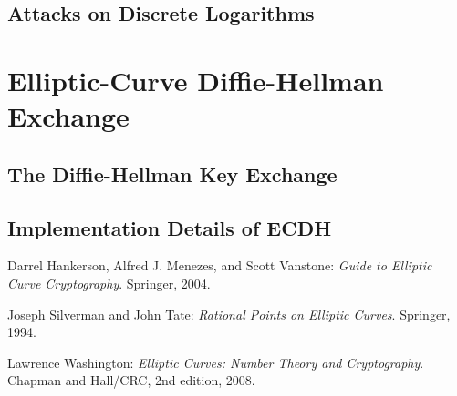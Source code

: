 \documentclass{article}
\begin{document}
\subsection{Attacks on Discrete Logarithms}

\clearpage

\section{Elliptic-Curve Diffie-Hellman Exchange}

\subsection{The Diffie-Hellman Key Exchange}

\subsection{Implementation Details of ECDH}

\clearpage

\begin{thebibliography}{9}

	Darrel Hankerson, Alfred J. Menezes, and Scott Vanstone:
	\emph{Guide to Elliptic Curve Cryptography}.
	Springer,
	2004.

	Joseph Silverman and John Tate:
	\emph{Rational Points on Elliptic Curves}.
	Springer,
	1994.

	Lawrence Washington:
	\emph{Elliptic Curves: Number Theory and Cryptography}.
	Chapman and Hall/CRC,
	2nd edition,
	2008.

\end{thebibliography}
\end{document}
